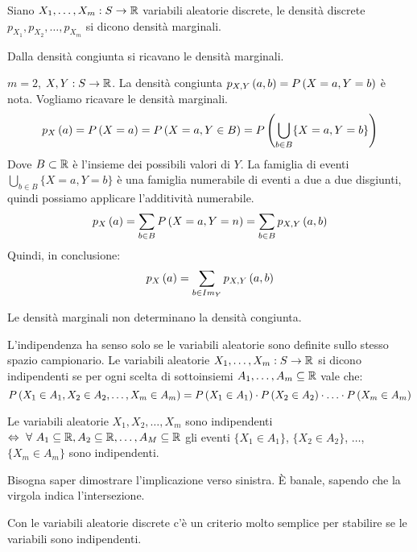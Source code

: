 Siano $X_1, \ldots, X_m : S \to \reals$ variabili aleatorie discrete, le densit\`a discrete $p_{X_1}, p_{X_2}, \ldots, p_{X_m}$ si dicono densit\`a marginali.

\begin{prop}
Dalla densit\`a congiunta si ricavano le densit\`a marginali.
\end{prop}
\begin{exmp}
$m = 2$, $X, Y : S \to \reals$. La densit\`a congiunta $\mass[X,Y]{a,b} = \prob{X = a, Y = b}$ \`e nota. Vogliamo ricavare le densit\`a marginali.
\[
\mass{a} = \prob{X = a} = \prob{X = a, Y \in B} = 
\prob{ \bigcup_{b \in B} \{X = a, Y = b\}}
\]
Dove $B \subset \reals$ \`e l'insieme dei possibili valori di $Y$. La famiglia di eventi $\bigcup_{b \in B} \{X = a, Y = b\}$ \`e una famiglia numerabile di eventi a due a due disgiunti, quindi possiamo applicare l'additivit\`a numerabile.
\[
\mass{a} = \sum_{b \in B} \prob{X = a, Y = n} = \sum_{b \in B} \mass[X,Y]{a,b}
\]
Quindi, in conclusione:
\[
\mass{a} = \sum_{b \in \image{Y}} \mass[X,Y]{a,b}
\]
\end{exmp}

\begin{oss}
Le densit\`a marginali non determinano la densit\`a congiunta.
\end{oss}

\begin{defn}
L'indipendenza ha senso solo se le variabili aleatorie sono definite sullo stesso spazio campionario. Le variabili aleatorie $X_1, \dots, X_m : S \to \reals$ si dicono indipendenti se per ogni scelta di sottoinsiemi $A_1, \dots, A_m \subseteq \reals$ vale che:
\[
\prob{X_1 \in A_1, X_2 \in A_2, \ldots, X_m \in A_m} = \prob{X_1 \in A_1} \cdot \prob{X_2 \in A_2} \cdot \ldots \cdot \prob{X_m \in A_m}
\]
\end{defn}

\begin{fact}
Le variabili aleatorie $X_1, X_2, \ldots, X_m$ sono indipendenti $\iff \forall A_1 \subseteq \reals, A_2 \subseteq \reals, \ldots, A_M \subseteq \reals$ gli eventi $\{X_1 \in A_1\}$, $\{X_2 \in A_2\}$, $\ldots$, $\{ X_m \in A_m\}$ sono indipendenti.
\end{fact}

Bisogna saper dimostrare l'implicazione verso sinistra. \`E banale, sapendo che la virgola indica l'intersezione.

Con le variabili aleatorie discrete c'\`e un criterio molto semplice per stabilire se le variabili sono indipendenti.

